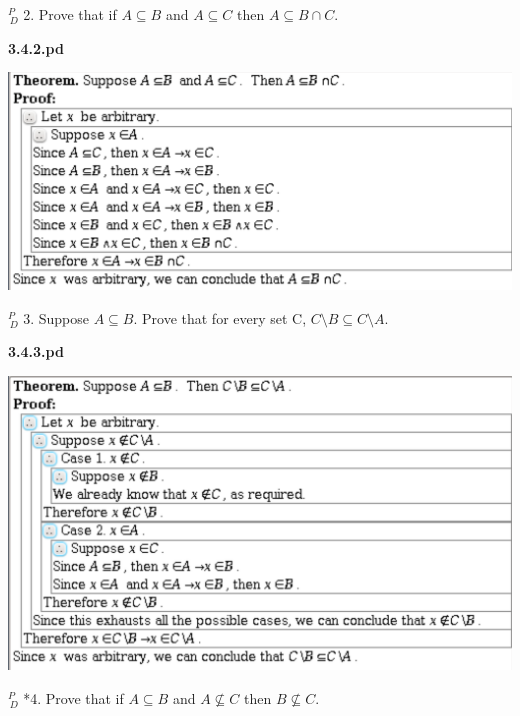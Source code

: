 \documentclass{article}
\begin{document}
\vspace{30pt}

$^{\textit{P}}_{\, \textit{D}}$ 2. Prove that if $A \subseteq B$ and $A \subseteq C$ then $A \subseteq B \cap C$.
\vspace{30pt}

\textbf{3.4.2.pd}
\vspace{10pt}

\includegraphics[width=\textwidth]{3_4_2}

\vspace{30pt}

$^{\textit{P}}_{\, \textit{D}}$ 3. Suppose $A \subseteq B$. Prove that for every set C, $C \setminus B \subseteq C \setminus A$.
\vspace{30pt}

\textbf{3.4.3.pd}
\vspace{10pt}

\includegraphics[width=\textwidth]{3_4_3}

\vspace{30pt}

$^{\textit{P}}_{\, \textit{D}}$ *4. Prove that if $A \subseteq B$ and $A \nsubseteq C$ then $B \nsubseteq C$.
\vspace{30pt}
\end{document}
